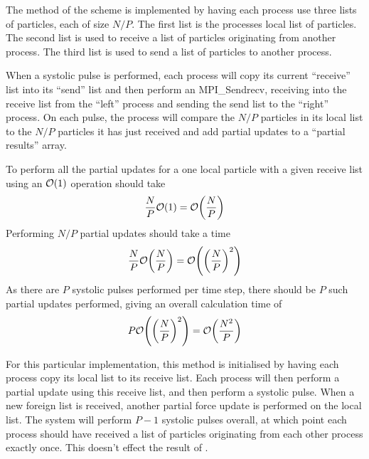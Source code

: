 The \pairoperation{} method of the \systolicloop{} scheme is
implemented by having each process use three lists of particles,
each of size $N/P$.
%
The first list is the processes local list of particles.
%
The second list is used to receive a list of particles originating from
another process.
%
The third list is used to send a list of particles to another process.

When a systolic pulse is performed,
each process will copy its current ``receive''
list into its ``send'' list and then perform an MPI\_Sendrecv, receiving
into the receive list from the ``left'' process and sending the send list
to the ``right'' process.
%
On each pulse, the process will compare the $N/P$ particles in its
local list to the $N/P$ particles it has just received and
add partial updates to a ``partial results'' array.

%
To perform all the partial updates for a one local particle
with a given receive list using an $\mathcal{O}{\left({ 1 }\right)}$ operation should take
\begin{equation}
    \frac{N}{P}\mathcal{O}{\left({ 1 }\right)} = \mathcal{O}{\left({ \frac{N}{P} }\right)}
\end  {equation}
%
Performing $N/P$ partial updates should take a time
\begin{equation}
    \frac{N}{P}\mathcal{O}{\left({ \frac{N}{P} }\right)} = \mathcal{O}{\left({ \left( \frac{N}{P} \right)^2 }\right)}
\end  {equation}
%
As there are $P$ systolic pulses performed per time step,
there should be $P$ such partial updates
performed, giving an overall calculation time of
\begin{equation}
    \label{eqn:systolic_loop_pair_operation_overall_time}
    P\mathcal{O}{\left({  \left(\frac{N}{P}\right)^2  }\right)} = \mathcal{O}{\left({ \frac{N^2}{P} }\right)}
\end  {equation}


For this particular implementation,
this method is initialised by having each process
copy its local list to its receive list.
%
Each process will then perform a partial update using this receive
list, and then perform a systolic pulse.
%
When a new foreign list is received, another partial force update
is performed on the local list.
%
The system will perform $P-1$ systolic pulses overall, at which point
each process should have received a list of particles originating
from each other process exactly once.
%
This doesn't effect the result of
.


